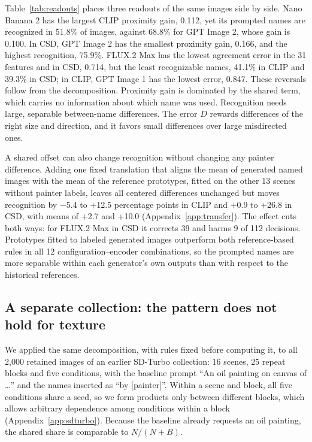 \documentclass[10pt]{article}
\begin{document}


Table~\ref{tab:readouts} places three readouts of the same images side by side.
Nano Banana 2 has the largest CLIP proximity gain, 0.112, yet its prompted names are
recognized in 51.8\% of images, against 68.8\% for GPT Image 2, whose gain is 0.100.
In CSD, GPT Image 2 has the smallest proximity gain, 0.166, and the highest
recognition, 75.9\%. FLUX.2 Max has the lowest agreement error in the 31 features
and in CSD, 0.714, but the least recognizable names, 41.1\% in CLIP and 39.3\% in
CSD; in CLIP, GPT Image 1 has the lowest error, 0.847. These reversals follow from
the decomposition. Proximity gain is dominated by the shared term, which carries no
information about which name was used. Recognition needs large, separable
between-name differences. The error $D$ rewards differences of the right size and
direction, and it favors small differences over large misdirected ones.

A shared offset can also change recognition without changing any painter
difference. Adding one fixed translation that aligns the mean of generated named
images with the mean of the reference prototypes, fitted on the other 13 scenes
without painter labels, leaves all centered differences unchanged but moves
recognition by $-$5.4 to +12.5 percentage points in CLIP and +0.9 to +26.8 in CSD,
with means of +2.7 and +10.0 (Appendix~\ref{app:transfer}). The effect cuts both
ways: for FLUX.2 Max in CSD it corrects 39 and harms 9 of 112 decisions. Prototypes
fitted to labeled generated images outperform both reference-based rules in all 12
configuration--encoder combinations, so the prompted names are more separable within
each generator's own outputs than with respect to the historical references.

\subsection{A separate collection: the pattern does not hold for texture}\label{sec:sdturbo}



We applied the same decomposition, with rules fixed before computing it, to all
2,000 retained images of an earlier SD-Turbo collection: 16 scenes, 25 repeat
blocks and five conditions, with the baseline prompt ``An oil painting on canvas of
\ldots'' and the names inserted as ``by [painter]''. Within a scene and block, all
five conditions share a seed, so we form products only between different blocks,
which allows arbitrary dependence among conditions within a block
(Appendix~\ref{app:sdturbo}). Because the baseline already requests an oil painting,
the shared share is comparable to $N/(N+B)$.
\end{document}
